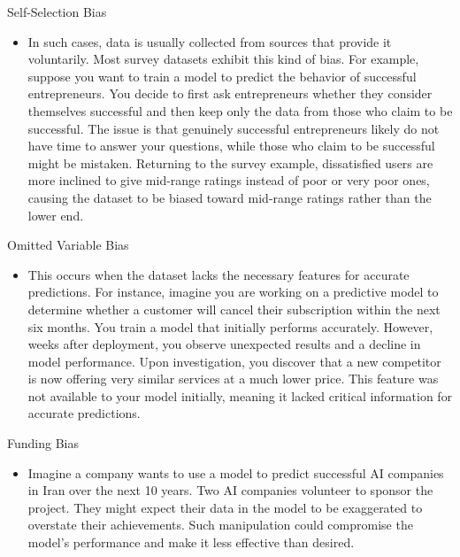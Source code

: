 \documentclass[serif, aspectratio=169]{beamer}
\begin{document}
\begin{frame}{Self-Selection Bias}
    \begin{itemize}
        \item In such cases, data is usually collected from sources that provide it voluntarily. Most survey datasets exhibit this kind of bias. For example, suppose you want to train a model to predict the behavior of successful entrepreneurs. You decide to first ask entrepreneurs whether they consider themselves successful and then keep only the data from those who claim to be successful. The issue is that genuinely successful entrepreneurs likely do not have time to answer your questions, while those who claim to be successful might be mistaken. Returning to the survey example, dissatisfied users are more inclined to give mid-range ratings instead of poor or very poor ones, causing the dataset to be biased toward mid-range ratings rather than the lower end.
    \end{itemize}
\end{frame}

\begin{frame}{Omitted Variable Bias}
    \begin{itemize}
        \item This occurs when the dataset lacks the necessary features for accurate predictions. For instance, imagine you are working on a predictive model to determine whether a customer will cancel their subscription within the next six months. You train a model that initially performs accurately. However, weeks after deployment, you observe unexpected results and a decline in model performance. Upon investigation, you discover that a new competitor is now offering very similar services at a much lower price. This feature was not available to your model initially, meaning it lacked critical information for accurate predictions.
    \end{itemize}
\end{frame}

\begin{frame}{Funding Bias}
    \begin{itemize}
        \item Imagine a company wants to use a model to predict successful AI companies in Iran over the next 10 years. Two AI companies volunteer to sponsor the project. They might expect their data in the model to be exaggerated to overstate their achievements. Such manipulation could compromise the model's performance and make it less effective than desired.
    \end{itemize}
\end{frame}
\end{document}
